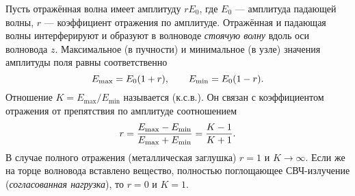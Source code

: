 Пусть отражённая волна имеет амплитуду $r E_0$, где $E_0$ --- амплитуда
падающей волны, $r$ --- коэффициент отражения по амплитуде.
Отражённая и падающая волны интерферируют и образуют в волноводе 
\emph{стоячую волну} вдоль оси волновода $z$.
Максимальное (в пучности) и минимальное (в узле) значения амплитуды поля равны
соответственно 
\begin{equation*} \eqmark{2.0.5} 
E_{\text{max}}=E_0(1+r),
\qquad E_{\text{min}}=E_0(1-r). 
\end{equation*} 
Отношение
$K=E_{\text{max}}/E_{\text{min}}$ называется  (к.с.в.). Он связан с коэффициентом отражения от препятствия по амплитуде
соотношением
\begin{equation} \eqmark{2.0.6}
r=\dfrac{E_{\text{max}}-E_{\text{min}}}{E_{\text{max}}+E_{\text{min}}}=\dfrac{K-1}{K+1}. 
\end{equation}
В случае полного отражения (металлическая заглушка) $r=1$ и $K\to \infty$.
Если же на торце волновода вставлено вещество, полностью поглощающее СВЧ-­излучение
(\emph{согласованная нагрузка}),  то $r=0$ и $K=1$.

%
%
%


